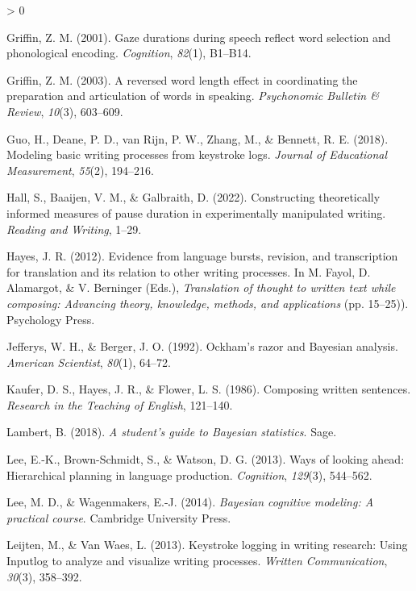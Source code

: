 \documentclass[
  english,
  man,floatsintext]{apa7}
\newlength{\cslhangindent}
\newenvironment{CSLReferences}[2] %
 {%
  \setlength{\parindent}{0pt}
  \ifodd #1 \everypar{\setlength{\hangindent}{\cslhangindent}}\ignorespaces\fi
  \ifnum #2 > 0
  \setlength{\parskip}{#2\baselineskip}
  \fi
 }%
 {}
\begin{document}
\begin{CSLReferences}{1}{0}
\leavevmode\hypertarget{ref-gri01}{}%
Griffin, Z. M. (2001). Gaze durations during speech reflect word selection and phonological encoding. \emph{Cognition}, \emph{82}(1), B1--B14.

\leavevmode\hypertarget{ref-griffin2003reversed}{}%
Griffin, Z. M. (2003). A reversed word length effect in coordinating the preparation and articulation of words in speaking. \emph{Psychonomic Bulletin \& Review}, \emph{10}(3), 603--609.

\leavevmode\hypertarget{ref-guo2018modeling}{}%
Guo, H., Deane, P. D., van Rijn, P. W., Zhang, M., \& Bennett, R. E. (2018). Modeling basic writing processes from keystroke logs. \emph{Journal of Educational Measurement}, \emph{55}(2), 194--216.

\leavevmode\hypertarget{ref-hall2022constructing}{}%
Hall, S., Baaijen, V. M., \& Galbraith, D. (2022). Constructing theoretically informed measures of pause duration in experimentally manipulated writing. \emph{Reading and Writing}, 1--29.

\leavevmode\hypertarget{ref-hayes2012evidence}{}%
Hayes, J. R. (2012). Evidence from language bursts, revision, and transcription for translation and its relation to other writing processes. In M. Fayol, D. Alamargot, \& V. Berninger (Eds.), \emph{Translation of thought to written text while composing: Advancing theory, knowledge, methods, and applications} (pp. 15--25)). Psychology Press.

\leavevmode\hypertarget{ref-jefferys1992ockham}{}%
Jefferys, W. H., \& Berger, J. O. (1992). Ockham's razor and {B}ayesian analysis. \emph{American Scientist}, \emph{80}(1), 64--72.

\leavevmode\hypertarget{ref-kaufer1986composing}{}%
Kaufer, D. S., Hayes, J. R., \& Flower, L. S. (1986). Composing written sentences. \emph{Research in the Teaching of English}, 121--140.

\leavevmode\hypertarget{ref-lambert2018student}{}%
Lambert, B. (2018). \emph{A student's guide to {B}ayesian statistics}. Sage.

\leavevmode\hypertarget{ref-lee13}{}%
Lee, E.-K., Brown-Schmidt, S., \& Watson, D. G. (2013). Ways of looking ahead: Hierarchical planning in language production. \emph{Cognition}, \emph{129}(3), 544--562.

\leavevmode\hypertarget{ref-lee2014bayesian}{}%
Lee, M. D., \& Wagenmakers, E.-J. (2014). \emph{Bayesian cognitive modeling: A practical course}. Cambridge University Press.

\leavevmode\hypertarget{ref-leijten2013keystroke}{}%
Leijten, M., \& Van Waes, L. (2013). Keystroke logging in writing research: Using {Inputlog} to analyze and visualize writing processes. \emph{Written Communication}, \emph{30}(3), 358--392.


\end{CSLReferences}
\end{document}
